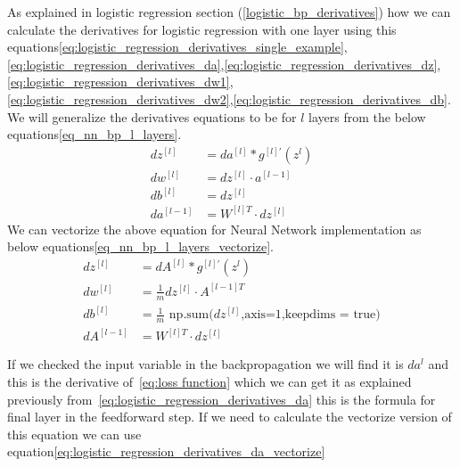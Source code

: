 As explained in logistic regression section (\ref{logistic_bp_derivatives}) how we can calculate the derivatives for logistic regression with one layer using this equations\eqref{eq:logistic_regression_derivatives_single_example},\eqref{eq:logistic_regression_derivatives_da},\eqref{eq:logistic_regression_derivatives_dz},\\
\eqref{eq:logistic_regression_derivatives_dw1},\eqref{eq:logistic_regression_derivatives_dw2},\eqref{eq:logistic_regression_derivatives_db}.\\
We will generalize the derivatives equations to be for $l$ layers from the below equations\eqref{eq_nn_bp_l_layers}.
 \begin{subequations}\label{eq_nn_bp_l_layers}
   \begin{align}
     dz^{[l]} & = da^{[l]} * g^{[l]'}(z^{l}) \\
     dw^{[l]} & = dz^{[l]} \cdot a^{[l-1]} \\
     db^{[l]} & = dz^{[l]} \\
     da^{[l-1]} & = W^{[l]T} \cdot dz^{[l]} %
 \end{align}
\end{subequations}
We can vectorize the above equation for Neural Network implementation as below equations\eqref{eq_nn_bp_l_layers_vectorize}.
 \begin{subequations}\label{eq_nn_bp_l_layers_vectorize}
   \begin{align}
     dz^{[l]} & = dA^{[l]} * g^{[l]'}(z^{l}) \\
     dw^{[l]} & = \frac{1}{m} dz^{[l]} \cdot A^{[l-1]T} \\
     db^{[l]} & = \frac{1}{m} \text{ np.sum(}dz^{[l]}\text{,axis=1,keepdims = true)} \\
     dA^{[l-1]} & = W^{[l]T} \cdot dz^{[l]} %
 \end{align}
\end{subequations}

If we checked the input variable in the backpropagation we will find it is $da^{l}$ and this is the derivative of~\eqref{eq:loss function} which we can get it as explained previously from~\eqref{eq:logistic_regression_derivatives_da} this is the formula for final layer in the feedforward step. If we need to calculate the vectorize version of this equation we can use equation\eqref{eq:logistic_regression_derivatives_da_vectorize}

